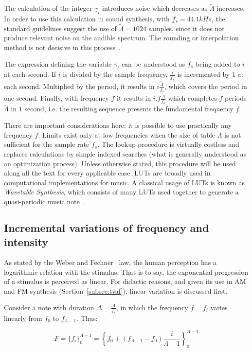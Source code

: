 The calculation of the integer $\gamma_i$ introduces noise which decreases as $\widetilde{\Lambda}$ increases.
In order to use this calculation in sound synthesis, with $f_s=44.1 kHz$, the standard guidelines suggest the use of $\widetilde{\Lambda} = 1024$ samples, since it does not produce relevant noise on the audible spectrum. The rounding or interpolation method is not decisive in this process~\cite{Geiger}.

The expression defining the variable $\gamma_i$ can be understood as $f_s$ being added to $i$ at each second.
If $i$ is divided by the sample frequency, $\frac{i}{f_s}$
is incremented by $1$ at each second. Multiplied by the period, it results in $i \frac{\widetilde{\Lambda}}{f_s}$, which covers the period in one second. Finally, with frequency $f$ it results in $i . f \frac{\widetilde{\Lambda}}{f_s}$ which completes $f$ periods $\widetilde{\Lambda}$ in $1$ second, i.e. the resulting sequence presents the fundamental frequency $f$.

There are important considerations here: it is possible to use practically any frequency $f$. Limits exist only at low frequencies when the size of table $\widetilde{\Lambda}$ is not sufficient for the sample rate $f_s$. The lookup procedure is virtually costless and replaces calculations by simple indexed searches (what is generally understood as an optimization process). Unless otherwise stated, this procedure will be used along all the text for every applicable case.
LUTs are broadly used in computational implementations for music. A classical usage of LUTs is known as \emph{Wavetable Synthesis}, which consists of many LUTs used together to generate a quasi-periodic music note~\cite{Cook,Wavetable}.

\subsection{Incremental variations of frequency and intensity}\label{subsec:vars}
As stated by the Weber and Fechner~\cite{Weber-Fechner} law, the human perception has a logarithmic relation with the stimulus. That is to say, the exponential progression of a stimulus is perceived as linear.
For didactic reasons, and given its use in AM and FM synthesis (Section~\ref{subsec:tvaf}), linear variation is discussed first.

Consider a note with duration $\Delta = \frac{\Lambda}{f_s}$, in which the frequency $f=f_i$ varies linearly from $f_0$ to $f_{\Lambda -1}$. Thus:

\begin{equation}\label{freqLinear}
 F=\{f_i\}_0^{\Lambda-1}=\left\{f_0 + (f_{\Lambda-1}-f_0)\frac{i}{\Lambda-1} \right\}_0^{\Lambda-1}
\end{equation}


